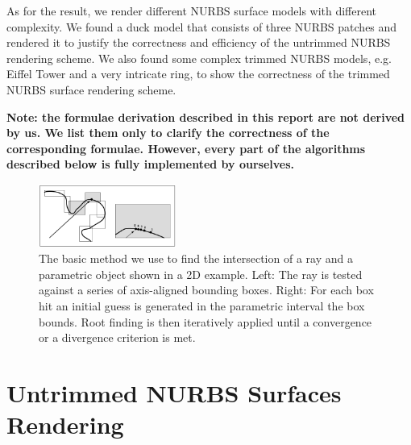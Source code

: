 \documentclass[acmtog]{acmart}
\begin{document}
As for the result, we render different NURBS surface models with different complexity. We found a duck model that consists of three NURBS patches and rendered it to justify the correctness and efficiency of the untrimmed NURBS rendering scheme. We also found some complex trimmed NURBS models, e.g. Eiffel Tower and a very intricate ring, to show the correctness of the trimmed NURBS surface rendering scheme.

\textbf{Note: the formulae derivation described in this report are not derived by us. We list them only to clarify the correctness of the corresponding formulae. However, every part of the algorithms described below is fully implemented by ourselves.}

\begin{figure}[t]
    \centering
    \includegraphics[width=0.4\textwidth]{overview.png}
    \caption{The basic method we use to find the intersection of a ray and a parametric object shown in a 2D example. Left: The ray is tested against a series of axis-aligned bounding boxes. Right: For each box hit an initial guess is generated in the parametric interval the box bounds. Root finding is then iteratively applied until a convergence or a divergence criterion is met.}
\end{figure}

\section{Untrimmed NURBS Surfaces Rendering}
\end{document}
